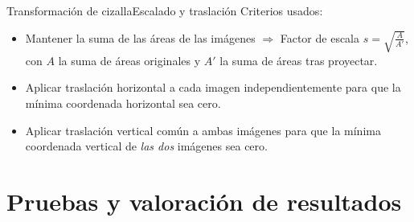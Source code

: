 \documentclass[14pt,spanish]{beamer}
\begin{document}
          \begin{frame}{Transformación de cizalla}{Escalado y traslación}
              Criterios usados:
              \begin{itemize}
                  \item Mantener la suma de las áreas de las imágenes $\Longrightarrow$ Factor de escala $s = \sqrt{\frac{A}{A'}}$, con $A$ la suma de áreas originales y $A'$ la suma de áreas tras proyectar.
                  \item Aplicar traslación horizontal a cada imagen independientemente para que la mínima coordenada horizontal sea cero.
                  \item Aplicar traslación vertical común a ambas imágenes para que la mínima coordenada vertical de \emph{las dos} imágenes sea cero.
              \end{itemize}
          \end{frame}



    \section{Pruebas y valoración de resultados}
\end{document}
